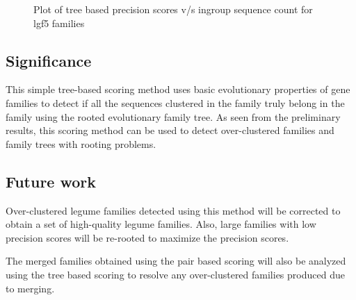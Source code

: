 \documentclass{article}
\begin{document}
		\begin{figure}[h!]
			\caption{Plot of tree based precision scores v/s ingroup sequence count for lgf5 families}
			\label{fig:scatter_tree_precision_vs_seqct_lgf5}
		\end{figure}
		
		\subsection{Significance}
		This simple tree-based scoring method uses basic evolutionary properties of gene families to detect if all the sequences clustered in the family truly belong in the family using the rooted evolutionary family tree. As seen from the preliminary results, this scoring method can be used to detect over-clustered families and family trees with rooting problems.
		
		
		\subsection{Future work}
		Over-clustered legume families detected using this method will be corrected to obtain a set of high-quality legume families. Also, large families with low precision scores will be re-rooted to maximize the precision scores.
		
		The merged families obtained using the pair based scoring will also be analyzed using the tree based scoring to resolve any over-clustered families produced due to merging.
		
\end{document}
